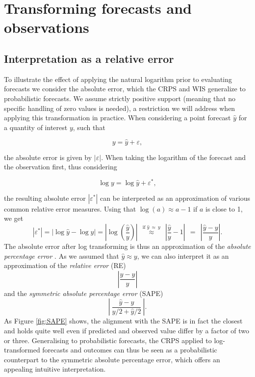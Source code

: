 \documentclass{article}
\begin{document}
\section{Transforming forecasts and observations}
\label{sec:methods}

\subsection{Interpretation as a relative error}
\label{sec:methods:relative}

To illustrate the effect of applying the natural logarithm prior to evaluating forecasts we consider the absolute error, which the CRPS and WIS generalize to probabilistic forecasts. We assume strictly positive support (meaning that no specific handling of zero values is needed), a restriction we will address when applying this transformation in practice. When considering a point forecast $\hat{y}$ for a quantity of interest $y$, such that 
%
\begin{linenomath*}
\begin{equation*}
y = \hat{y} + \varepsilon,
\end{equation*}
\end{linenomath*}
the absolute error is given by $|\varepsilon|$. When taking the logarithm of the forecast and the observation first, thus considering 
\begin{linenomath*}
\begin{equation*}
\log y = \log \hat{y} + \varepsilon^*,
\end{equation*}
\end{linenomath*}
the resulting absolute error $\left|\varepsilon^*\right|$ can be interpreted as an approximation of various common relative error measures. Using that $\log(a) \approx a - 1$ if $a$ is close to 1, we get
$$
|\varepsilon^*| = |\log \hat{y} - \log y| = \left|\log\left(\frac{\hat{y}}{y}\right) \right| \ \ \stackrel{\text{if } \hat{y} \ \approx \ y}{\approx} \ \ \left| \frac{\hat{y}}{y} - 1 \right| \ \ = \ \ \left| \frac{\hat{y} - y}{y} \right|.
$$
The absolute error after log transforming is thus an approximation of the \textit{absolute percentage error} \citep[APE,][]{gneitingMakingEvaluatingPoint2011a}. As we assumed that $\hat{y} \approx y$, we can also interpret it as an approximation of the \textit{relative error} (RE)
$$
\left| \frac{\hat{y} - y}{\hat{y}} \right|
$$
and the \textit{symmetric absolute percentage error} (SAPE)
$$
\left| \ \frac{\hat{y} - y}{y/2 + \hat{y}/2} \ \right|.
$$
As Figure \ref{fig:SAPE} shows, the alignment with the SAPE is in fact the closest and holds quite well even if predicted and observed value differ by a factor of two or three. Generalising to probabilistic forecasts, the CRPS applied to log-transformed forecasts and outcomes can thus be seen as a probabilistic counterpart to the symmetric absolute percentage error, which offers an appealing intuitive interpretation.
\end{document}
